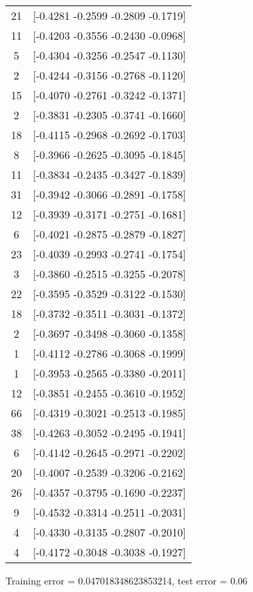 \documentclass[12pt, fullpage,letterpaper]{article}
\begin{document}
\begin{enumerate}
\begin{enumerate}
{\begin{longtable}{|c|c|}
			 21 &  [-0.4281 -0.2599 -0.2809 -0.1719] \\
			 11 &  [-0.4203 -0.3556 -0.2430 -0.0968] \\
			  5 &  [-0.4304 -0.3256 -0.2547 -0.1130] \\
			  2 &  [-0.4244 -0.3156 -0.2768 -0.1120] \\
			 15 &  [-0.4070 -0.2761 -0.3242 -0.1371] \\
			  2 &  [-0.3831 -0.2305 -0.3741 -0.1660] \\
			 18 &  [-0.4115 -0.2968 -0.2692 -0.1703] \\
			  8 &  [-0.3966 -0.2625 -0.3095 -0.1845] \\
			 11 &  [-0.3834 -0.2435 -0.3427 -0.1839] \\
			 31 &  [-0.3942 -0.3066 -0.2891 -0.1758] \\
			 12 &  [-0.3939 -0.3171 -0.2751 -0.1681] \\
			  6 &  [-0.4021 -0.2875 -0.2879 -0.1827] \\
			 23 &  [-0.4039 -0.2993 -0.2741 -0.1754] \\
			  3 &  [-0.3860 -0.2515 -0.3255 -0.2078] \\
			 22 &  [-0.3595 -0.3529 -0.3122 -0.1530] \\
			 18 &  [-0.3732 -0.3511 -0.3031 -0.1372] \\
			  2 &  [-0.3697 -0.3498 -0.3060 -0.1358] \\
			  1 &  [-0.4112 -0.2786 -0.3068 -0.1999] \\
			  1 &  [-0.3953 -0.2565 -0.3380 -0.2011] \\
			 12 &  [-0.3851 -0.2455 -0.3610 -0.1952] \\
			 66 &  [-0.4319 -0.3021 -0.2513 -0.1985] \\
			 38 &  [-0.4263 -0.3052 -0.2495 -0.1941] \\
			  6 &  [-0.4142 -0.2645 -0.2971 -0.2202] \\
			 20 &  [-0.4007 -0.2539 -0.3206 -0.2162] \\
			 26 &  [-0.4357 -0.3795 -0.1690 -0.2237] \\
			  9 &  [-0.4532 -0.3314 -0.2511 -0.2031] \\
			  4 &  [-0.4330 -0.3135 -0.2807 -0.2010] \\
			  4 &  [-0.4172 -0.3048 -0.3038 -0.1927] \\
		\end{longtable}}
		
	Training error = 0.047018348623853214, test error = 0.06



\end{enumerate}
\end{enumerate}
\end{document}
